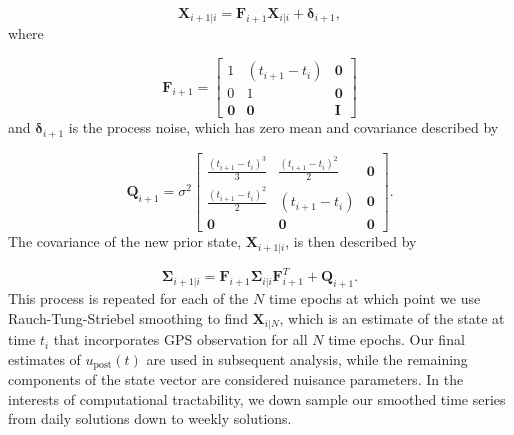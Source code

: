 \documentclass[draft,linenumbers]{AGUJournal}
\begin{document}
\begin{equation}\label{predict}
  \mathbf{X}_{i+1|i} = \mathbf{F}_{i+1}\mathbf{X}_{i|i} + \mathbf{\delta}_{i+1}, 
\end{equation}
where 

\begin{equation}
  \mathbf{F}_{i+1} = 
  \left[
  \begin{array}{ccc}
    1           & (t_{i+1} - t_i) & \mathbf{0}\\
    0           & 1              & \mathbf{0}\\
    \mathbf{0}  & \mathbf{0}     & \mathbf{I}
  \end{array}
  \right]
\end{equation}
and $\mathbf{\delta}_{i+1}$ is the process noise, which has zero mean and covariance described by

\begin{equation}
  \mathbf{Q}_{i+1} = 
  \sigma^2 \left[
  \begin{array}{ccc}
  \frac{(t_{i+1} - t_i)^3}{3} & \frac{(t_{i+1} - t_{i})^2}{2} & \mathbf{0}\\
  \frac{(t_{i+1} - t_i)^2}{2} & (t_{i+1} - t_{i}) & \mathbf{0}\\ 
  \mathbf{0} & \mathbf{0} & \mathbf{0}
  \end{array}
  \right].
\end{equation}
The covariance of the new prior state, $\mathbf{X}_{i+1|i}$, is then described by

\begin{equation}
  \mathbf{\Sigma}_{i+1|i} = \mathbf{F}_{i+1}\mathbf{\Sigma}_{i|i}\mathbf{F}^T_{i+1} + \mathbf{Q}_{i+1}.
\end{equation}
This process is repeated for each of the $N$ time epochs at which point we use Rauch-Tung-Striebel smoothing \citep{Rauch1965} to find $\mathbf{X}_{i|N}$, which is an estimate of the state at time $t_i$ that incorporates GPS observation for all $N$ time epochs.  Our final estimates of $u_\mathrm{post}(t)$ are used in subsequent analysis, while the remaining components of the state vector are considered nuisance parameters. In the interests of computational tractability, we down sample our smoothed time series from daily solutions down to weekly solutions.
\end{document}
